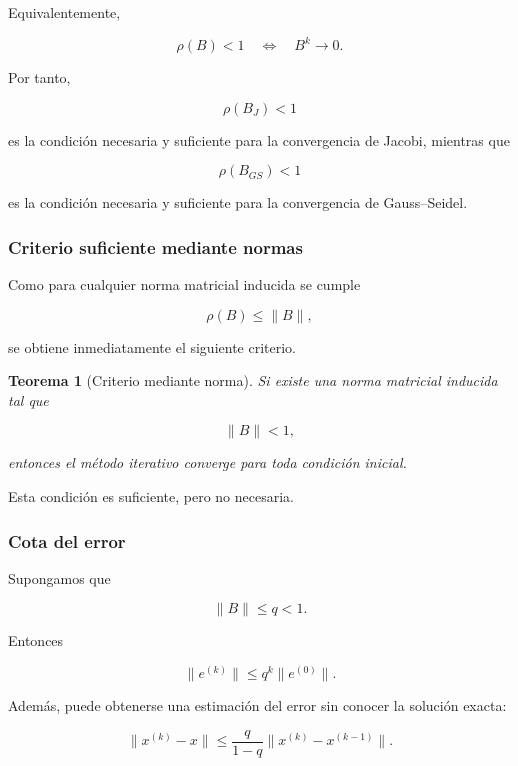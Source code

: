 \documentclass[12pt]{article}
\newtheorem{teorema}{Teorema}
\begin{document}
Equivalentemente,

\[
    \rho(B)<1
    \quad\Longleftrightarrow\quad
    B^k\longrightarrow0.
\]

Por tanto,

\[
    \boxed{
    \rho(B_J)<1
    }
\]

es la condición necesaria y suficiente para la convergencia de Jacobi,
mientras que

\[
    \boxed{
    \rho(B_{GS})<1
    }
\]

es la condición necesaria y suficiente para la convergencia de
Gauss--Seidel.


\subsubsection*{Criterio suficiente mediante normas}

Como para cualquier norma matricial inducida se cumple

\[
    \rho(B)\leq\|B\|,
\]

se obtiene inmediatamente el siguiente criterio.

\begin{teorema}[Criterio mediante norma]
Si existe una norma matricial inducida tal que

\[
    \boxed{
    \|B\|<1,
    }
\]

entonces el método iterativo converge para toda condición inicial.
\end{teorema}

Esta condición es suficiente, pero no necesaria.


\subsubsection*{Cota del error}

Supongamos que

\[
    \|B\|\leq q<1.
\]

Entonces

\[
    \|e^{(k)}\|
    \leq
    q^k\|e^{(0)}\|.
\]

Además, puede obtenerse una estimación del error sin conocer la
solución exacta:

\[
    \boxed{
    \|x^{(k)}-x\|
    \leq
    \frac{q}{1-q}
    \|x^{(k)}-x^{(k-1)}\|.
    }
\]
\end{document}
